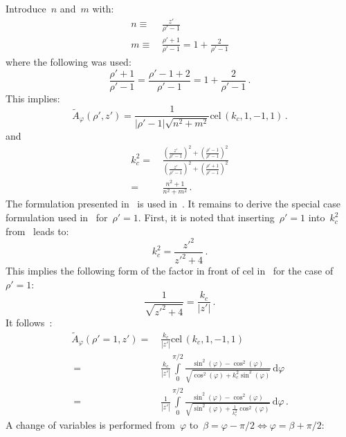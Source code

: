 Introduce~$n$ and~$m$ with:
\begin{align}
  n \equiv&\, \frac{z'}{\rho'-1} \\
  m \equiv&\, \frac{\rho' + 1}{\rho'-1}
    = 1 + \frac{2}{\rho' - 1}
\end{align}
where the following was used:
\begin{equation}
    \frac{\rho' + 1}{\rho' - 1}
  = \frac{\rho'-1 + 2}{\rho' - 1}
  = 1 + \frac{2}{\rho' - 1} \, .
\end{equation}
This implies:
\begin{equation}
 \tilde{A}_\varphi(\rho',z')
 = \frac{1}{|\rho'-1| \sqrt{n^2 + m^2}} \textrm{cel}\,(k_c, 1, -1, 1) \, .
\end{equation}
and
\begin{align}
  k_c^2
 =&\, \frac{\left(\frac{z'}{\rho'-1}\right)^2 + \left( \frac{\rho' - 1}{\rho'-1} \right)^2}
           {\left(\frac{z'}{\rho'-1}\right)^2 + \left( \frac{\rho' + 1}{\rho'-1} \right)^2} \nonumber \\
 =&\, \frac{n^2 + 1}
           {n^2 + m^2} \, . \label{eqn:cwl_kCSq_mn}
\end{align}
The formulation presented in~ is used in~.
It remains to derive the special case formulation used in~ for~$\rho'=1$.
First, it is noted that inserting~$\rho'=1$ into~$k_c^2$ from~ leads to:
\begin{equation}
  k_c^2 = \frac{z'^2}{z'^2 + 4} \, .
\end{equation}
This implies the following form of the factor in front of cel in~
for the case of~$\rho'=1$:
\begin{equation}
  \frac{1}{\sqrt{z'^2 + 4}} = \frac{k_c}{|z'|} \, .
\end{equation}
It follows~\cite{bulirsch_3}:
\begin{align}
  \tilde{A}_\varphi(\rho'=1,z') =&\, \frac{k_c}{|z'|} \textrm{cel}\,(k_c, 1, -1, 1) \nonumber \\
  ~ =&\, \frac{k_c}{|z'|} \int\limits_0^{\pi/2} \frac{\sin^2(\varphi) - \cos^2(\varphi)}{\sqrt{\cos^2(\varphi) + k_c^2 \sin^2(\varphi)}} \,\mathrm{d}\varphi \nonumber \\
  ~ =&\,   \frac{1}{|z'|} \int\limits_0^{\pi/2} \frac{\sin^2(\varphi) - \cos^2(\varphi)}{\sqrt{\sin^2(\varphi) + \frac{1}{k_c^2} \cos^2(\varphi)}} \,\mathrm{d}\varphi \, .
\end{align}
A change of variables is performed from~$\varphi$ to~$\beta = \varphi - \pi/2 \Leftrightarrow \varphi = \beta + \pi/2$:
